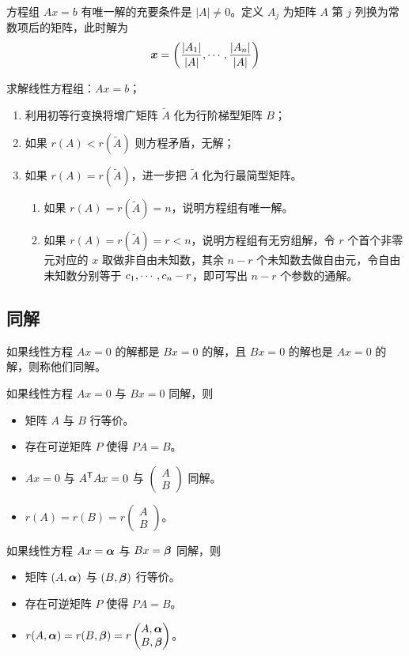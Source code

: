 \begin{theorem}[Cramer 法则]
	方程组 $Ax = b$ 有唯一解的充要条件是 $|A| \neq 0$。定义 $A_j$ 为矩阵 $A$ 第 $j$ 列换为常数项后的矩阵，此时解为
	\[ \boldsymbol{x} = \left( \frac{|A_1|}{|A|}, \cdots, \frac{|A_n|}{|A|} \right) \]
\end{theorem}

求解线性方程组：$Ax = b$；
\begin{enumerate}
	\item 利用初等行变换将增广矩阵 $\widetilde{A}$ 化为行阶梯型矩阵 $B$；
	\item 如果 $r(A) < r(\widetilde{A})$ 则方程矛盾，无解；
	\item 如果 $r(A) = r(\widetilde{A})$，进一步把 $\widetilde{A}$ 化为行最简型矩阵。
	      \begin{enumerate}
		      \item 如果 $r(A) = r(\widetilde{A}) = n$，说明方程组有唯一解。
		      \item 如果 $r(A) = r(\widetilde{A}) = r < n$，说明方程组有无穷组解，令 $r$ 个首个非零元对应的 $x$ 取做非自由未知数，其余 $n-r$ 个未知数去做自由元，令自由未知数分别等于 $c_1,\cdots,c_n-r$，即可写出 $n-r$ 个参数的通解。
	      \end{enumerate}
\end{enumerate}

\subsection{同解}

如果线性方程 $Ax=0$ 的解都是 $Bx=0$ 的解，且 $Bx=0$ 的解也是 $Ax=0$ 的解，则称他们同解。

如果线性方程 $Ax=0$ 与 $Bx=0$ 同解，则
\begin{itemize}
	\item 矩阵 $A$ 与 $B$ 行等价。
	\item 存在可逆矩阵 $P$ 使得 $PA = B$。
	\item $Ax=0$ 与 ${A}^\mathsf{T}Ax =0$ 与 $\begin{pmatrix}
			      A \\ B
		      \end{pmatrix}$ 同解。
	\item $r(A) = r(B) = r\begin{pmatrix}
			      A \\ B
		      \end{pmatrix}$。
\end{itemize}

如果线性方程 $Ax=\boldsymbol{\alpha}$ 与 $Bx=\boldsymbol{\beta}$ 同解，则
\begin{itemize}
	\item 矩阵 $(A,\boldsymbol{\alpha})$ 与 $(B,\boldsymbol{\beta})$ 行等价。
	\item 存在可逆矩阵 $P$ 使得 $PA = B$。
	\item $r(A,\boldsymbol{\alpha}) = r(B,\boldsymbol{\beta}) = r\begin{pmatrix}
			      A,\boldsymbol{\alpha} \\ B,\boldsymbol{\beta}
		      \end{pmatrix}$。
\end{itemize}

